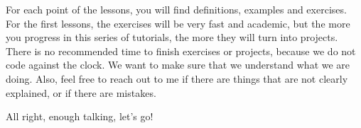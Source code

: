 \documentclass[a4paper,11pt]{article}
\theoremstyle{mytheor}
\begin{document}
\vspace{5mm}

For each point of the lessons, you will find definitions, examples and exercises.
For the first lessons, the exercises will be very fast and academic, but the more
you progress in this series of tutorials, the more they will turn into projects.
There is no recommended time to finish exercises or projects, because we do not
code against the clock. We want to make sure that we understand what we are doing.
Also, feel free to reach out to me if there are things that are not clearly explained,
or if there are mistakes.

\vspace{5mm}

All right, enough talking, let's go!

\newpage

\tableofcontents

\newpage


\end{document}
